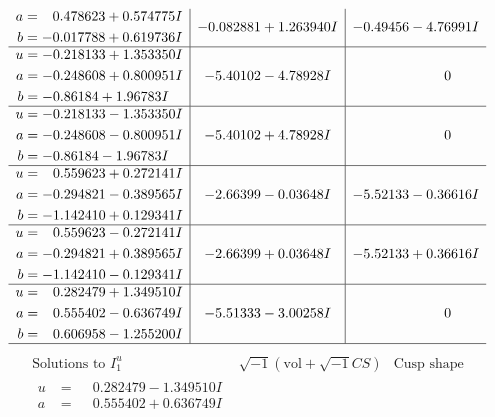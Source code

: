 \documentclass[1p]{elsarticle_modified}
\theoremstyle{definition}
\newcommand{\I}{\sqrt{-1}}
\begin{document}
$$\begin{array}{c|c|c}
\begin{aligned}
a &= \phantom{-}0.478623 + 0.574775 I \\
b &= -0.017788 + 0.619736 I\end{aligned}
 & -0.082881 + 1.263940 I & -0.49456 - 4.76991 I \\ \hline\begin{aligned}
u &= -0.218133 + 1.353350 I \\
a &= -0.248608 + 0.800951 I \\
b &= -0.86184 + 1.96783 I\end{aligned}
 & -5.40102 - 4.78928 I & \phantom{-0.000000 } 0 \\ \hline\begin{aligned}
u &= -0.218133 - 1.353350 I \\
a &= -0.248608 - 0.800951 I \\
b &= -0.86184 - 1.96783 I\end{aligned}
 & -5.40102 + 4.78928 I & \phantom{-0.000000 } 0 \\ \hline\begin{aligned}
u &= \phantom{-}0.559623 + 0.272141 I \\
a &= -0.294821 - 0.389565 I \\
b &= -1.142410 + 0.129341 I\end{aligned}
 & -2.66399 - 0.03648 I & -5.52133 - 0.36616 I \\ \hline\begin{aligned}
u &= \phantom{-}0.559623 - 0.272141 I \\
a &= -0.294821 + 0.389565 I \\
b &= -1.142410 - 0.129341 I\end{aligned}
 & -2.66399 + 0.03648 I & -5.52133 + 0.36616 I \\ \hline\begin{aligned}
u &= \phantom{-}0.282479 + 1.349510 I \\
a &= \phantom{-}0.555402 - 0.636749 I \\
b &= \phantom{-}0.606958 - 1.255200 I\end{aligned}
 & -5.51333 - 3.00258 I & \phantom{-0.000000 } 0\\
 \hline 
 \end{array}$$\newpage$$\begin{array}{c|c|c}  
\text{Solutions to }I^u_{1}& \I (\text{vol} + \sqrt{-1}CS) & \text{Cusp shape}\\
 \hline 
\begin{aligned}
u &= \phantom{-}0.282479 - 1.349510 I \\
a &= \phantom{-}0.555402 + 0.636749 I \\

\end{aligned}
\end{array}$$
\end{document}
